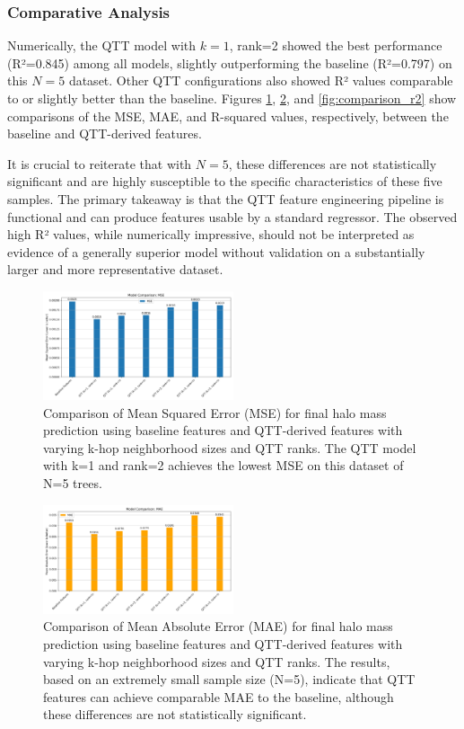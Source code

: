 \documentclass[twocolumn]{aastex631}
\begin{document}
\subsubsection{Comparative Analysis}
Numerically, the QTT model with $k=1$, rank=2 showed the best performance (R²=0.845) among all models, slightly outperforming the baseline (R²=0.797) on this $N=5$ dataset. Other QTT configurations also showed R² values comparable to or slightly better than the baseline. Figures \ref{fig:comparison_mse}, \ref{fig:comparison_mae}, and \ref{fig:comparison_r2} show comparisons of the MSE, MAE, and R-squared values, respectively, between the baseline and QTT-derived features.

It is crucial to reiterate that with $N=5$, these differences are not statistically significant and are highly susceptible to the specific characteristics of these five samples. The primary takeaway is that the QTT feature engineering pipeline is functional and can produce features usable by a standard regressor. The observed high R² values, while numerically impressive, should not be interpreted as evidence of a generally superior model without validation on a substantially larger and more representative dataset.

\begin{figure}[h!]
    \centering
    \includegraphics[width=0.5\textwidth]{../input_files/plots/comparison_mse_22_20250524-175150.png}
    \caption{Comparison of Mean Squared Error (MSE) for final halo mass prediction using baseline features and QTT-derived features with varying k-hop neighborhood sizes and QTT ranks. The QTT model with k=1 and rank=2 achieves the lowest MSE on this dataset of N=5 trees.
}
    \label{fig:comparison_mse}
\end{figure}

\begin{figure}[h!]
    \centering
    \includegraphics[width=0.5\textwidth]{../input_files/plots/comparison_mae_23_20250524-175150.png}
    \caption{Comparison of Mean Absolute Error (MAE) for final halo mass prediction using baseline features and QTT-derived features with varying k-hop neighborhood sizes and QTT ranks. The results, based on an extremely small sample size (N=5), indicate that QTT features can achieve comparable MAE to the baseline, although these differences are not statistically significant.
}
    \label{fig:comparison_mae}
\end{figure}
\end{document}
